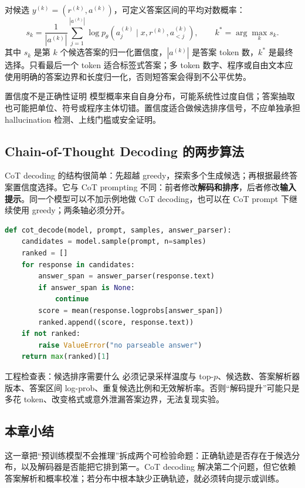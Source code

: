 对候选 $y^{(k)}=(r^{(k)},a^{(k)})$，可定义答案区间的平均对数概率：
\[
s_k=\frac{1}{|a^{(k)}|}\sum_{j=1}^{|a^{(k)}|}
\log p_\theta\!\left(a^{(k)}_j\mid x,r^{(k)},a^{(k)}_{<j}\right),
\qquad k^*=\arg\max_k s_k.
\]
其中 $s_k$ 是第 $k$ 个候选答案的归一化置信度，$|a^{(k)}|$ 是答案 token 数，$k^*$ 是最终选择。只看最后一个 token 适合标签式答案；多 token 数字、程序或自由文本应使用明确的答案边界和长度归一化，否则短答案会得到不公平优势。

\begin{warningbox}{置信度不是正确性证明}
模型概率来自自身分布，可能系统性过度自信；答案抽取也可能把单位、符号或程序主体切错。置信度适合做候选排序信号，不应单独承担 hallucination 检测、上线门槛或安全证明。
\end{warningbox}

\subsection{Chain-of-Thought Decoding 的两步算法}

CoT decoding 的结构很简单：先超越 greedy，探索多个生成候选；再根据最终答案置信度选择。它与 CoT prompting 不同：前者修改\textbf{解码和排序}，后者修改\textbf{输入提示}。同一个模型可以不加示例地做 CoT decoding，也可以在 CoT prompt 下继续使用 greedy；两条轴必须分开。


\begin{lstlisting}[language=Python,caption={按答案置信度重排 CoT 候选的最小伪代码}]
def cot_decode(model, prompt, samples, answer_parser):
    candidates = model.sample(prompt, n=samples)
    ranked = []
    for response in candidates:
        answer_span = answer_parser(response.text)
        if answer_span is None:
            continue
        score = mean(response.logprobs[answer_span])
        ranked.append((score, response.text))
    if not ranked:
        raise ValueError("no parseable answer")
    return max(ranked)[1]
\end{lstlisting}

\begin{knowledgebox}{工程检查表：候选排序需要什么}
必须记录采样温度与 top-$p$、候选数、答案解析器版本、答案区间 log-prob、重复候选比例和无效解析率。否则“解码提升”可能只是多花 token、改变格式或意外泄漏答案边界，无法复现实验。
\end{knowledgebox}


\subsection{本章小结}

这一章把“预训练模型不会推理”拆成两个可检验命题：正确轨迹是否存在于候选分布，以及解码器是否能把它排到第一。CoT decoding 解决第二个问题，但它依赖答案解析和概率校准；若分布中根本缺少正确轨迹，就必须转向提示或训练。

